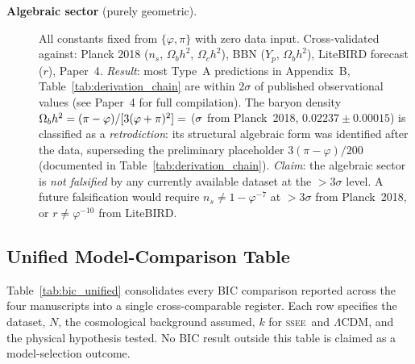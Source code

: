 \documentclass[12pt,a4paper]{article}
\newcommand{\SSEE}{\ifmmode\mathrm{SSEE}\else\textsc{ssee}\fi}
\begin{document}
\begin{description}
  \item[\textbf{Algebraic sector} (purely geometric).]
  All constants fixed from $\{\varphi,\pi\}$ with zero data input.
  Cross-validated against: Planck 2018 ($n_s$, $\Omega_b h^2$, $\Omega_c h^2$),
  BBN ($Y_p$, $\Omega_b h^2$), LiteBIRD forecast ($r$), Paper~4.
  \textit{Result}: most Type~A predictions in Appendix~B,
  Table~\ref{tab:derivation_chain} are within $2\sigma$ of published
  observational values (see Paper~4 for full compilation).
  The baryon density $\Omega_b h^2 = (\pi-\varphi)/[3(\varphi+\pi)^2] = \val{OMEGA_B_H2_d6}$
  ($\val{wb_planck_sig}\sigma$ from Planck~2018, $0.02237\pm0.00015$) is classified as a
  \emph{retrodiction}: its structural algebraic form was identified after the
  data, superseding the preliminary placeholder $3(\pi-\varphi)/200$
  (documented in Table~\ref{tab:derivation_chain}).
  \textit{Claim}: the algebraic sector is \emph{not falsified} by any
  currently available dataset at the $>3\sigma$ level. A future falsification would require
  $n_s\neq1-\varphi^{-7}$ at $>3\sigma$ from Planck~2018,
  or $r\neq\varphi^{-10}$ from LiteBIRD.

\end{description}

\subsection{Unified Model-Comparison Table}
\label{sec:bic_unified}

Table~\ref{tab:bic_unified} consolidates every BIC comparison reported
across the four manuscripts into a single cross-comparable register.
Each row specifies the dataset, $N$, the cosmological background assumed,
$k$ for \SSEE\ and $\Lambda$CDM, and the physical hypothesis tested.
No BIC result outside this table is claimed as a model-selection outcome.
\end{document}
